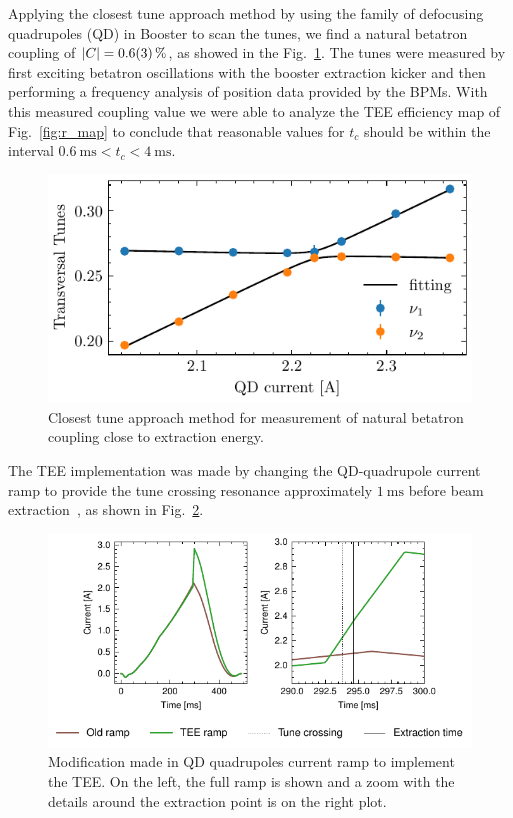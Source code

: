 \documentclass[a4paper,
               keeplastbox,   %
              nospread,     %
               ]{jacow}
\begin{document}
Applying the closest tune approach method by using the family of defocusing quadrupoles (QD) in Booster to scan the tunes, we find a natural betatron coupling of $|C|=\SI{0.6 \pm 0.3}{\%}$, as showed in the Fig.~\ref{fig:coupling_exp}. The tunes were measured by first exciting betatron oscillations with the booster extraction kicker and then performing a frequency analysis of position data provided by the BPMs. %
With this measured coupling value we were able to analyze the TEE efficiency map of Fig.~\ref{fig:r_map} to conclude that reasonable values for $t_c$ should be within the interval $\SI{0.6}{\milli \second}<t_c<\SI{4}{\milli \second}$.
\begin{figure}%
    \centering
    \includegraphics[width=0.85\linewidth]{THPOPT056_f3.pdf}
    \caption{Closest tune approach method for measurement of natural betatron coupling close to extraction energy.}
    \label{fig:coupling_exp}
\end{figure}

The TEE implementation was made by changing the QD-quadrupole current ramp to provide the tune crossing resonance approximately $\SI{1}{\milli \second}$ before beam extraction~\cite{Kallestrup2020}, as shown in Fig.~\ref{fig:bo_ramps}.
\begin{figure}[ht]
    \centering
    \includegraphics[width=0.9\linewidth]{THPOPT056_f4.pdf}
    \caption{Modification made in QD quadrupoles current ramp to implement the TEE. On the left, the full ramp is shown and a zoom with the details around the extraction point is on the right plot.}
    \label{fig:bo_ramps}
\end{figure}
\end{document}
